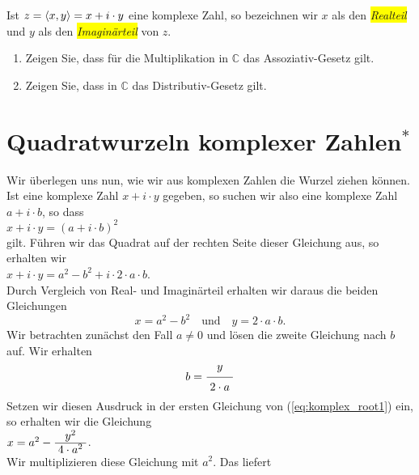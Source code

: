 Ist $z = \pair(x,y) = x + i \cdot y$ eine komplexe Zahl, so bezeichnen wir $x$ als den \colorbox{yellow}{\emph{Realteil}}
und $y$ als den \colorbox{yellow}{\emph{Imagin\"{a}rteil}} von $z$.

\exercise
\renewcommand{\labelenumi}{(\alph{enumi})}
\begin{enumerate}
\item Zeigen Sie, dass f\"{u}r die Multiplikation in $\mathbb{C}$ das Assoziativ-Gesetz gilt.
\item Zeigen Sie, dass in $\mathbb{C}$ das Distributiv-Gesetz gilt. \exend
\end{enumerate}
\renewcommand{\labelenumi}{\arabic{enumi}.}


\section{Quadratwurzeln komplexer Zahlen$^*$}
Wir \"{u}berlegen uns nun, wie wir aus komplexen Zahlen die Wurzel ziehen k\"{o}nnen.  Ist eine komplexe Zahl
$x + i \cdot y$ gegeben, so suchen wir also eine komplexe Zahl $a + i \cdot b$, so dass
\\[0.2cm]
\hspace*{1.3cm}
$x + i \cdot y = (a + i \cdot b)^2$
\\[0.2cm]
gilt.  F\"{u}hren wir das Quadrat auf der rechten Seite dieser Gleichung aus, so erhalten wir
\\[0.2cm]
\hspace*{1.3cm}
$x + i \cdot y = a^2 - b^2 + i \cdot 2 \cdot a \cdot b$.
\\[0.2cm]
Durch Vergleich von Real- und Imagin\"{a}rteil erhalten wir daraus die beiden Gleichungen
\begin{equation}
  \label{eq:komplex_root1}
  x = a^2 - b^2 \quad \mbox{und} \quad y = 2 \cdot a \cdot b.
\end{equation}
Wir betrachten zun\"{a}chst den Fall $a \not= 0$ und
l\"{o}sen die zweite Gleichung nach $b$ auf.  Wir erhalten
\begin{equation}
  \label{eq:komplex_root2}
  b = \bruch{y}{2 \cdot a}  
\end{equation}
Setzen wir diesen Ausdruck in der ersten Gleichung von (\ref{eq:komplex_root1}) ein, so erhalten wir die
Gleichung 
\\[0.2cm]
\hspace*{1.3cm}
$x = a^2 - \bruch{y^2}{4 \cdot a^2}$.
\\[0.2cm]
Wir multiplizieren diese Gleichung mit $a^2$. Das liefert 
\\[0.2cm]
